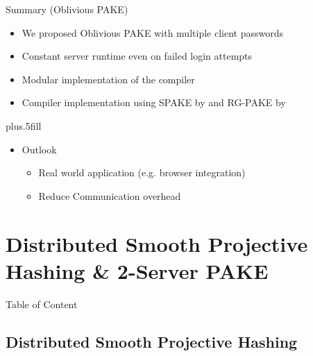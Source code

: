 \documentclass[notes,xcolor=dvipsnames]{beamer}
\begin{document}
\begin{frame}{Summary (Oblivious PAKE)}

  \begin{itemize}
  \item We proposed \alert{Oblivious PAKE} with multiple client passwords
  \item \alert{Constant server runtime} even on failed login attempts
  \item \alert{Modular implementation} of the compiler
  \item Compiler implementation using SPAKE by \cite{Abdalla2005} and RG-PAKE by \cite{Gennaro2008}
  \end{itemize}
  
  \vskip0pt plus.5fill
  \begin{itemize}
  \item
    Outlook
    \begin{itemize}
    \item Real world application (e.g. browser integration)
    \item Reduce Communication overhead
    \end{itemize}
  \end{itemize}
\end{frame}


\section{Distributed Smooth Projective Hashing \& 2-Server PAKE}

\begin{frame}{Table of Content}
\tableofcontents[currentsection]
\end{frame}

\subsection{Distributed Smooth Projective Hashing}
\end{document}
